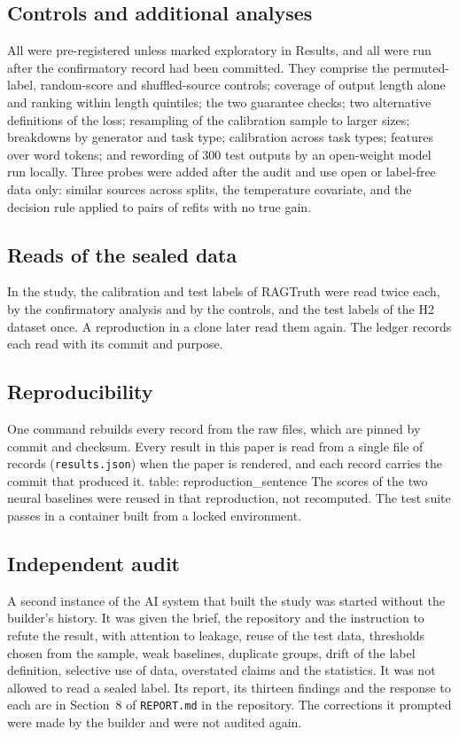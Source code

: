 \documentclass[11pt]{article}
\begin{document}
\subsection*{Controls and additional analyses}
All were pre-registered unless marked exploratory in Results, and all were run after the confirmatory record had been committed. They comprise the permuted-label, random-score and shuffled-source controls; coverage of output length alone and ranking within length quintiles; the two guarantee checks; two alternative definitions of the loss; resampling of the calibration sample to larger sizes; breakdowns by generator and task type; calibration across task types; features over word tokens; and rewording of 300 test outputs by an open-weight model run locally. Three probes were added after the audit and use open or label-free data only: similar sources across splits, the temperature covariate, and the decision rule applied to pairs of refits with no true gain.

\subsection*{Reads of the sealed data}
In the study, the calibration and test labels of RAGTruth were read twice each, by the confirmatory analysis and by the controls, and the test labels of the H2 dataset once. A reproduction in a clone later read them again. The ledger records each read with its commit and purpose.

\subsection*{Reproducibility}
One command rebuilds every record from the raw files, which are pinned by commit and checksum. Every result in this paper is read from a single file of records (\texttt{results.json}) when the paper is rendered, and each record carries the commit that produced it. {{table: reproduction_sentence}} The scores of the two neural baselines were reused in that reproduction, not recomputed. The test suite passes in a container built from a locked environment.

\subsection*{Independent audit}
A second instance of the AI system that built the study was started without the builder's history. It was given the brief, the repository and the instruction to refute the result, with attention to leakage, reuse of the test data, thresholds chosen from the sample, weak baselines, duplicate groups, drift of the label definition, selective use of data, overstated claims and the statistics. It was not allowed to read a sealed label. Its report, its thirteen findings and the response to each are in Section~8 of \texttt{REPORT.md} in the repository. The corrections it prompted were made by the builder and were not audited again.
\end{document}
